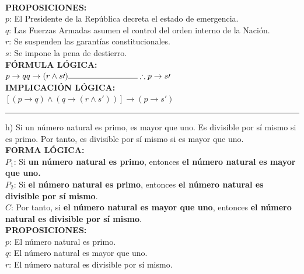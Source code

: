 \documentclass[letterpaper,12pt]{article}
\begin{document}
\begin{sloppypar}
\vspace{0.3cm}\\ 
\textbf{PROPOSICIONES:} \\
$p$: El Presidente de la República decreta el estado de emergencia. \\ 
$q$: Las Fuerzas Armadas asumen el control del orden interno de la Nación. \\ 
$r$: Se suspenden las garantías constitucionales. \\ 
$s$: Se impone la pena de destierro. 
\vspace{0.3cm}\\ 
\textbf{FÓRMULA LÓGICA:} \\
$p \rightarrow q \\ q \rightarrow (r \wedge s\prime) \\ \noindent\rule{3cm}{0.4pt} \\ \therefore p \rightarrow s\prime$
\vspace{0.3cm}\\ 
\textbf{IMPLICACIÓN LÓGICA:} \\
$[(p \rightarrow q)\wedge(q \rightarrow (r \wedge s\prime))]\rightarrow (p \rightarrow s\prime)$
\vspace{0.3cm} 
\hrule 
\vspace{0.3cm} 
h) Si un número natural es primo, es mayor que uno. Es divisible por sí mismo si es primo. Por tanto, es
divisible por sí mismo si es mayor que uno.
\vspace{0.3cm}\\ 
\textbf{FORMA LÓGICA:} \\
$P_1$: Si \textcolor[rgb]{1,0,0}{\textbf{un número natural es primo}}, entonces \textcolor[rgb]{0.2,0.5,0.7}{\textbf{el número natural es mayor que uno.}} \\ 
$P_2$: Si \textcolor[rgb]{1,0,0}{\textbf{el número natural es primo}}, entonces \textcolor[rgb]{0.2,0.7,0.5}{\textbf{el número natural es divisible por sí mismo}}. \\ 
$C$: Por tanto, si \textcolor[rgb]{0.2,0.5,0.7}{\textbf{el número natural es mayor que uno}}, entonces \textcolor[rgb]{0.2,0.7,0.5}{\textbf{el número natural es divisible por sí mismo}}.
\vspace{0.3cm}\\
\textbf{PROPOSICIONES:} \\
$p$: El número natural es primo. \\ 
$q$: El número natural es mayor que uno. \\ 
$r$: El número natural es divisible por sí mismo.

\end{sloppypar}
\end{document}
